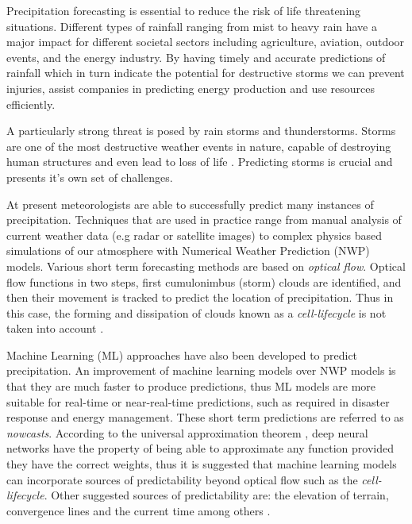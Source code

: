 Precipitation forecasting is essential to reduce the risk of life threatening situations. Different types of rainfall ranging from mist to heavy rain have a major impact for different societal sectors including agriculture, aviation, outdoor events, and the energy industry.
By having timely and accurate predictions of rainfall which in turn indicate the potential for destructive storms we can prevent injuries, assist companies in predicting energy production and use resources efficiently.
\medskip

A particularly strong threat is posed by rain storms and thunderstorms. Storms are one of the most destructive weather events in nature, capable of destroying human structures and even lead to loss of life \cite{noaa-national-severe-storms-laboratory-no-date}. Predicting storms is crucial and presents it's own set of challenges.
\medskip

At present meteorologists are able to successfully predict many instances of precipitation. Techniques that are used in practice range from manual analysis of current weather data (e.g radar or satellite images) to complex physics based simulations of our atmosphere with Numerical Weather Prediction (\textsc{NWP}) models.
Various short term forecasting methods are based on \textit{optical flow}. Optical flow functions in two steps, first cumulonimbus (storm) clouds are identified, and then their movement is tracked to predict the location of precipitation. Thus in this case, the forming and dissipation of clouds known as a \textit{cell-lifecycle} \cite{noaas-national-weather-service-no-date} is not taken into account \cite{prudden2020review}.
\medskip

Machine Learning (\textsc{ML}) approaches have also been developed to predict precipitation.
An improvement of machine learning models over \textsc{NWP} models is that they are much faster to produce predictions, thus ML models are more suitable for real-time or near-real-time predictions, such as required in disaster response and energy management. These short term predictions are referred to as \textit{nowcasts}. According to the universal approximation theorem \cite{cybenko-1989}, deep neural networks have the property of being able to approximate any function provided they have the correct weights, thus it is suggested that machine learning models can incorporate sources of predictability beyond optical flow such as the \textit{cell-lifecycle}.
Other suggested sources of predictability are: the elevation of terrain, convergence lines and the current time among others \cite{prudden2020review}.
\medskip

